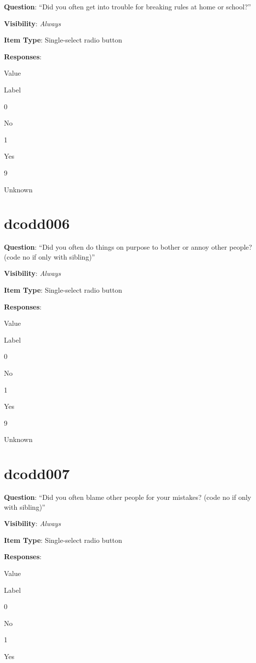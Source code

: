 \documentclass[]{book}
\begin{document}
\textbf{Question}: ``Did you often get into trouble for breaking rules at home or school?''

\textbf{Visibility}: \emph{Always}

\textbf{Item Type}: Single-select radio button

\textbf{Responses}:

Value

Label

0

No

1

Yes

9

Unknown

\hypertarget{dcodd006}{%
\section{dcodd006}\label{dcodd006}}

\textbf{Question}: ``Did you often do things on purpose to bother or annoy other people? (code no if only with sibling)''

\textbf{Visibility}: \emph{Always}

\textbf{Item Type}: Single-select radio button

\textbf{Responses}:

Value

Label

0

No

1

Yes

9

Unknown

\hypertarget{dcodd007}{%
\section{dcodd007}\label{dcodd007}}

\textbf{Question}: ``Did you often blame other people for your mistakes? (code no if only with sibling)''

\textbf{Visibility}: \emph{Always}

\textbf{Item Type}: Single-select radio button

\textbf{Responses}:

Value

Label

0

No

1

Yes
\end{document}
